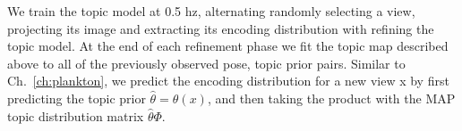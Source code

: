We train the topic model at 0.5 hz, alternating randomly selecting a view, projecting its image and extracting its encoding distribution with refining the topic model. At the end of each refinement phase we fit the topic map described above to all of the previously observed pose, topic prior pairs. Similar to Ch.~\ref{ch:plankton}, we predict the encoding distribution for a new view x by first predicting the topic prior $ \hat{\theta} = \theta (x)$, and then taking the product with the MAP topic distribution matrix $ \hat{\theta} \Phi$.

\citep{vqvae2017}

\begin{figure}
    \begin{minipage}{0.55\textwidth}
    \end{minipage} \hfill
    \begin{minipage}{0.44\textwidth}
\end{minipage}
\end{figure}

